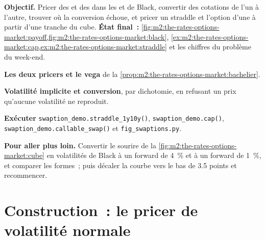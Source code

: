 \begin{tutorial}
\textbf{Objectif.} Pricer des  et des  dans les  et de Black,
convertir des cotations de l'un à l'autre, trouver où la conversion échoue, et pricer un
straddle et l'option d'une  à partir d'une tranche du cube. \textbf{État final~:}
\cref{fig:m2:the-rates-options-market:payoff,fig:m2:the-rates-options-market:black},
\cref{ex:m2:the-rates-options-market:cap,ex:m2:the-rates-options-market:straddle}
et les chiffres du problème du week-end.
\begin{tutsteps}
\item \textbf{Les deux pricers et le vega} de
la \cref{prop:m2:the-rates-options-market:bachelier}.
\label{lst:m2:the-rates-options-market:pricers}
\item \textbf{Volatilité implicite et conversion}, par dichotomie, en refusant un
prix qu'aucune volatilité ne reproduit.
\label{lst:m2:the-rates-options-market:implied}
\item \textbf{Exécuter} \texttt{swaption\_demo.straddle\_1y10y()},
\texttt{swaption\_demo.cap()}, \texttt{swaption\_demo.callable\_swap()} et
\texttt{fig\_swaptions.py}.
\end{tutsteps}
\textbf{Pour aller plus loin.} Convertir le sourire de
la \cref{fig:m2:the-rates-options-market:cube} en volatilités de Black à un forward de 4~\%
et à un forward de 1~\%, et comparer les formes~; puis décaler la courbe vers le bas de 3.5
points et recommencer.
\end{tutorial}

\section{Construction~: le pricer de volatilité normale}\label{bld:m2:the-rates-options-market:normalvol}

